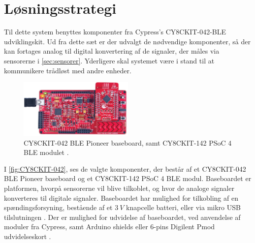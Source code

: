 \section{Løsningsstrategi}
Til dette system benyttes komponenter fra Cypress's CY8CKIT-042-BLE udviklingskit. 
Ud fra dette sæt er der udvalgt de nødvendige komponenter, så der kan fortages analog til digital konvertering af de signaler, der måles via sensorerne i \autoref{sec:sensorer}. Yderligere skal systemet være i stand til at kommunikere trådløst med andre enheder.   

\begin{figure}[H]
\centering
\includegraphics[width=0.5\textwidth]{figures/CY8CKIT-042.png}
\caption{CY8CKIT-042 BLE Pioneer baseboard, samt CY8CKIT-142 PSoC 4 BLE modulet \citep{cypresspsoc2015}.}
\label{fig:CY8CKIT-042}
\end{figure}

I \autoref{fig:CY8CKIT-042}, ses de valgte komponenter, der består af et CY8CKIT-042 BLE Pioneer baseboard og et CY8CKIT-142 PSoC 4 BLE modul. Baseboardet er platformen, hvorpå sensorerne vil blive tilkoblet, og hvor de analoge signaler konverteres til digitale signaler. Baseboardet har mulighed for tilkobling af en spændingsforsyning, bestående af et $3~V$ knapcelle batteri, eller via mikro USB tilslutningen \citep{cypressguide2014}. Der er mulighed for udvidelse af baseboardet, ved anvendelse af moduler fra Cypress, samt Arduino shields eller 6-pins Digilent Pmod udvidelseskort \citep{cypressguide2014}. 
\\


